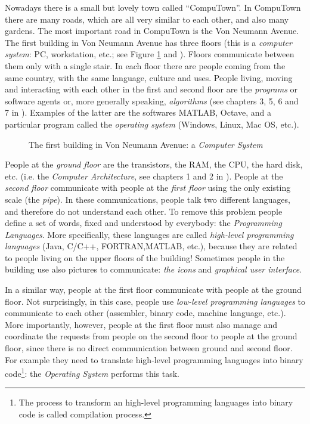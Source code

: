 \documentclass[12pt,a4paper,pdftex]{article}
\begin{document}
Nowadays there is a small but lovely town called ``CompuTown''. In CompuTown there are many roads, which are all very similar to each other, and also many gardens. The most important road in CompuTown is the Von Neumann Avenue. The first building in Von Neumann Avenue has three floors (this is a \emph{computer system}: PC, workstation, etc.; see Figure \ref{fig:building} and \cite{Brookshear}). Floors communicate between them only with a single stair. In each floor there are people coming from the same country, with the same language, culture and uses. People living, moving and interacting with each other in the first and second floor are  the \emph{programs} or software agents or, more generally speaking, \emph{algorithms} (see chapters 3, 5, 6 and 7 in \cite{Brookshear}). Examples of the latter are the softwares MATLAB, Octave, and a particular program called the \emph{operating system} (Windows, Linux, Mac OS, etc.).

\begin{figure}
  \hspace{-15pt}
  \epsfxsize=400pt 
  \caption{The first building in Von Neumann Avenue: a \emph{Computer System}}\label{fig:building}
\end{figure}


People at the \emph{ground floor} are the transistors, the RAM, the CPU, the hard disk, etc. (i.e. the \emph{Computer Architecture}, see chapters 1 and 2 in \citeauthor{Brookshear}).
People at the \emph{second floor} communicate with people at the \emph{first floor} using the only existing scale (the \emph{pipe}). In these communications, people talk two different languages, and therefore do not understand each other. To remove this problem people define a set of words, fixed and understood by everybody: the \emph{Programming Languages}. More specifically, these languages are called \emph{high-level programming languages} (Java, C/C++, FORTRAN,MATLAB, etc.), because they are related to people living on the upper floors of the building! Sometimes people in the building use also pictures to communicate: \emph{the icons} and  \emph{graphical user interface}.

In a similar way, people at the first floor communicate with people at the ground floor. Not surprisingly, in this case, people use \emph{low-level programming languages} to communicate to each other (assembler, binary code, machine language, etc.). More importantly, however, people at the first floor must also manage and coordinate the requests from people on the second floor to people at the ground floor, since there is no direct communication between ground and second floor. For example they need to translate high-level programming languages into binary code\footnote{The process to transform an high-level programming languages into binary code is called compilation process.}: the \emph{Operating System } performs this task.
\end{document}
